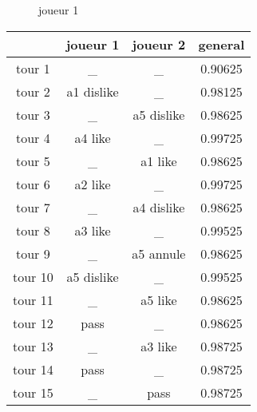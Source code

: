 \documentclass{article}
\begin{document}
\begin{figure}
\centering
{}
\caption{joueur 1}
\end{figure}
\begin{tabular}{|c|c|c|c|}
\hline
& joueur 1 & joueur 2 & general \\
\hline
tour 1 & \_ & \_ & 0.90625 \\
\hline
tour 2 & a1 dislike & \_ & 0.98125 \\
\hline
tour 3 & \_ & a5 dislike & 0.98625 \\
\hline
tour 4 & a4 like & \_ & 0.99725 \\
\hline
tour 5 & \_ & a1 like & 0.98625 \\
\hline
tour 6 & a2 like & \_ & 0.99725 \\
\hline
tour 7 & \_ & a4 dislike & 0.98625 \\
\hline
tour 8 & a3 like & \_ & 0.99525 \\
\hline
tour 9 & \_ & a5 annule & 0.98625 \\
\hline
tour 10 & a5 dislike & \_ & 0.99525 \\
\hline
tour 11 & \_ & a5 like & 0.98625 \\
\hline
tour 12 & pass & \_ & 0.98625 \\
\hline
tour 13 & \_ & a3 like & 0.98725 \\
\hline
tour 14 & pass & \_ & 0.98725 \\
\hline
tour 15 & \_ & pass & 0.98725 \\
\hline
\end{tabular}
\end{document}
